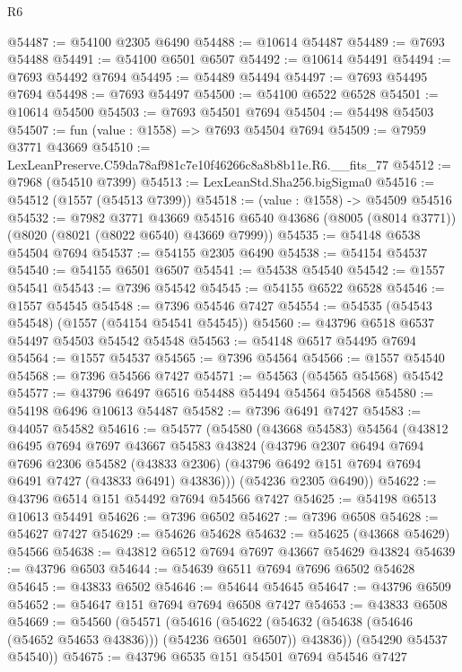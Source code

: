 \begin{lexlean}{R6}
\begin{coremodule}
@54487 := @54100 @2305 @6490
@54488 := @10614 @54487
@54489 := @7693 @54488
@54491 := @54100 @6501 @6507
@54492 := @10614 @54491
@54494 := @7693 @54492 @7694
@54495 := @54489 @54494
@54497 := @7693 @54495 @7694
@54498 := @7693 @54497
@54500 := @54100 @6522 @6528
@54501 := @10614 @54500
@54503 := @7693 @54501 @7694
@54504 := @54498 @54503
@54507 := fun (value : @1558) => @7693 @54504 @7694
@54509 := @7959 @3771 @43669
@54510 := LexLeanPreserve.C59da78af981c7e10f46266c8a8b8b11e.R6.__fits_77
@54512 := @7968 (@54510 @7399)
@54513 := LexLeanStd.Sha256.bigSigma0
@54516 := @54512 (@1557 (@54513 @7399))
@54518 := (value : @1558) -> @54509 @54516
@54532 := @7982
    @3771
    @43669
    @54516
    @6540
    @43686
    (@8005 (@8014 @3771))
    (@8020 (@8021 (@8022 @6540) @43669 @7999))
@54535 := @54148 @6538 @54504 @7694
@54537 := @54155 @2305 @6490
@54538 := @54154 @54537
@54540 := @54155 @6501 @6507
@54541 := @54538 @54540
@54542 := @1557 @54541
@54543 := @7396 @54542
@54545 := @54155 @6522 @6528
@54546 := @1557 @54545
@54548 := @7396 @54546 @7427
@54554 := @54535 (@54543 @54548) (@1557 (@54154 @54541 @54545))
@54560 := @43796 @6518 @6537 @54497 @54503 @54542 @54548
@54563 := @54148 @6517 @54495 @7694
@54564 := @1557 @54537
@54565 := @7396 @54564
@54566 := @1557 @54540
@54568 := @7396 @54566 @7427
@54571 := @54563 (@54565 @54568) @54542
@54577 := @43796 @6497 @6516 @54488 @54494 @54564 @54568
@54580 := @54198 @6496 @10613 @54487
@54582 := @7396 @6491 @7427
@54583 := @44057 @54582
@54616 := @54577
    (@54580
      (@43668 @54583)
      @54564
      (@43812
        @6495
        @7694
        @7697
        @43667
        @54583
        @43824
        (@43796
          @2307
          @6494
          @7694
          @7696
          @2306
          @54582
          (@43833 @2306)
          (@43796 @6492 @151 @7694 @7694 @6491 @7427 (@43833 @6491) @43836)))
      (@54236 @2305 @6490))
@54622 := @43796 @6514 @151 @54492 @7694 @54566 @7427
@54625 := @54198 @6513 @10613 @54491
@54626 := @7396 @6502
@54627 := @7396 @6508
@54628 := @54627 @7427
@54629 := @54626 @54628
@54632 := @54625 (@43668 @54629) @54566
@54638 := @43812 @6512 @7694 @7697 @43667 @54629 @43824
@54639 := @43796 @6503
@54644 := @54639 @6511 @7694 @7696 @6502 @54628
@54645 := @43833 @6502
@54646 := @54644 @54645
@54647 := @43796 @6509
@54652 := @54647 @151 @7694 @7694 @6508 @7427
@54653 := @43833 @6508
@54669 := @54560
    (@54571
      (@54616
        (@54622 (@54632 (@54638 (@54646 (@54652 @54653 @43836))) (@54236 @6501 @6507)) @43836))
      (@54290 @54537 @54540))
@54675 := @43796 @6535 @151 @54501 @7694 @54546 @7427

\end{coremodule}
\end{lexlean}
